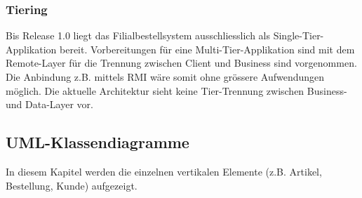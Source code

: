 \subsubsection{Tiering}
Bis Release 1.0 liegt das Filialbestellsystem ausschliesslich als Single-Tier-Applikation bereit. Vorbereitungen für eine Multi-Tier-Applikation sind mit dem Remote-Layer für die Trennung zwischen Client und Business sind vorgenommen. Die Anbindung z.B. mittels RMI wäre somit ohne grössere Aufwendungen möglich. Die aktuelle Architektur sieht keine Tier-Trennung zwischen Business- und Data-Layer vor.
\clearpage
\subsection{UML-Klassendiagramme}
In diesem Kapitel werden die einzelnen vertikalen Elemente (z.B. Artikel, Bestellung, Kunde) aufgezeigt.
